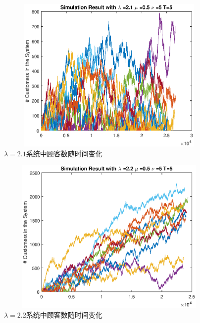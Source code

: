 \documentclass[a4paper, 12pt]{ctexart}
\begin{document}
\begin{figure}[H]
\centering
\includegraphics[width=5in,height=3in]{sim21.eps}
\caption{$\lambda=2.1$系统中顾客数随时间变化}
\label{fig:11}
\end{figure}
\bigskip

\begin{figure}[H]
\centering
\includegraphics[width=5in,height=3in]{sim22.eps}
\caption{$\lambda=2.2$系统中顾客数随时间变化}
\label{fig:12}
\end{figure}
\bigskip
\end{document}
